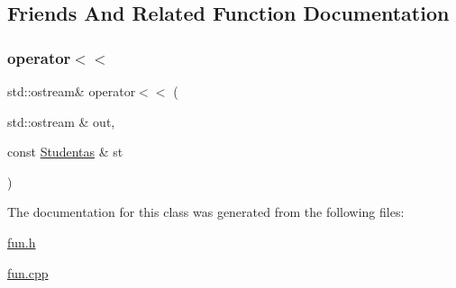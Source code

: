 \subsection{Friends And Related Function Documentation}
\mbox{\label{class_studentas_a75d9031fba1d66664f5ed4bb208a8e2c}} 
\subsubsection{\texorpdfstring{operator$<$$<$}{operator<<}}
{\footnotesize\ttfamily std\+::ostream\& operator$<$$<$ (\begin{DoxyParamCaption}\item[{std\+::ostream \&}]{out,  }\item[{const \mbox{\hyperlink{class_studentas}{Studentas}} \&}]{st }\end{DoxyParamCaption})\hspace{0.3cm}{\ttfamily [friend]}}



The documentation for this class was generated from the following files\+:\begin{DoxyCompactItemize}
\item 
\mbox{\hyperlink{fun_8h}{fun.\+h}}\item 
\mbox{\hyperlink{fun_8cpp}{fun.\+cpp}}\end{DoxyCompactItemize}
